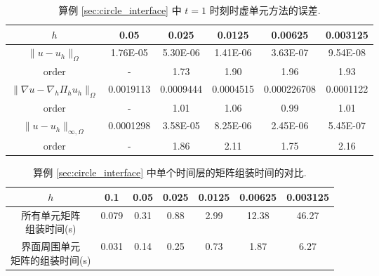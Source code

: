 \begin{table}[h]
\centering
\caption{算例 \ref{sec:circle_interface} 中 $t=1$ 时刻时虚单元方法的误差.}
\label{tab:circle_interface}
\begin{tabular}{|c|c|c|c|c|c|}
\hline
$h$ & 0.05 & 0.025 & 0.0125 & 0.00625 & 0.003125 \\
\hline
$\|u-u_h\|_{\Omega}$ & 1.76E-05 & 5.30E-06 & 1.41E-06 & 3.63E-07 &
9.54E-08 \\
\hline
$\mathrm{order}$ & - & 1.73 & 1.90 & 1.96 & 1.93 \\
\hline
$\|\nabla u-\nabla_h\Pi_hu_h\|_{\Omega}$ & 0.0019113 & 0.0009444 & 0.0004515 &
0.000226708 & 0.0001122 \\
\hline
$\mathrm{order}$ & - & 1.01 & 1.06 & 0.99 & 1.01 \\
\hline
$\|u-u_h\|_{\infty,\Omega}$ & 0.0001298 & 3.58E-05 & 8.25E-06 &
2.45E-06 & 5.45E-07 \\
\hline
$\mathrm{order}$ & - & 1.86 & 2.11 & 1.75 & 2.16 \\
\hline
\end{tabular}
\end{table}


\begin{table}[h]
\centering
\caption{算例 \ref{sec:circle_interface} 中单个时间层的矩阵组装时间的对比.}
\label{tab:circle_interface_assembly}
\begin{tabular}{|c|c|c|c|c|c|c|}
\hline
$h$ & 0.1 & 0.05 & 0.025 & 0.0125 & 0.00625 & 0.003125 \\
\hline
\makecell{所有单元矩阵\\组装时间(s)} & 0.079 & 0.31 & 0.88 & 2.99 & 12.38 & 46.27 \\
\hline
\makecell{界面周围单元\\矩阵的组装时间(s)} & 0.031 & 0.14 & 0.25 & 0.73 & 1.87 & 6.27 \\
\hline
\end{tabular}
\end{table}

